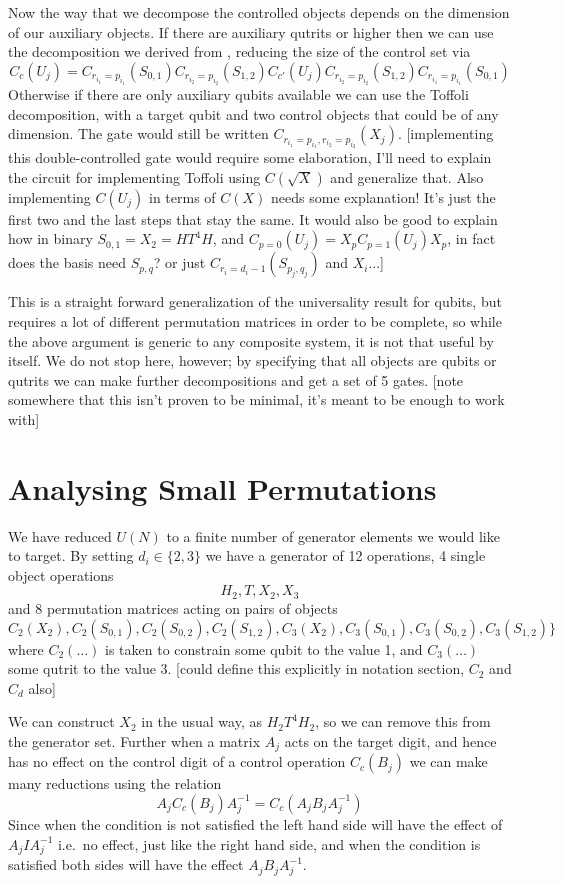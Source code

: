 Now the way that we decompose the controlled objects depends on the dimension of our auxiliary objects. If there are auxiliary qutrits or higher then we can use the decomposition we derived from \cite{multi-valued-logic}, reducing the size of the control set via
\[
C_c(U_j) = C_{r_{i_1}=p_{i_1}}(S_{0,1})
C_{r_{i_2}=p_{i_2}}(S_{1,2})
C_{c'}(U_j)
C_{r_{i_2}=p_{i_2}}(S_{1,2})
C_{r_{i_1}=p_{i_1}}(S_{0,1})
\]
Otherwise if there are only auxiliary qubits available we can use the Toffoli decomposition, with a target qubit and two control objects that could be of any dimension. The gate would still be written $C_{r_{i_1}=p_{i_1},r_{i_2}=p_{i_2}}(X_j)$. [implementing this double-controlled gate would require some elaboration, I'll need to explain the circuit for implementing Toffoli using $C(\sqrt{X})$ and generalize that. Also implementing $C(U_j)$ in terms of $C(X)$ needs some explanation! It's just the first two and the last steps that stay the same. It would also be good to explain how in binary $S_{0,1} = X_2 = HT^4H$, and $C_{p=0}(U_j) = X_pC_{p=1}(U_j)X_p$, in fact does the basis need $S_{p,q}$? or just $C_{r_i=d_i-1}(S_{p_j,q_j})$ and $X_i$...]

This is a straight forward generalization of the universality result for qubits, but requires a lot of different permutation matrices in order to be complete, so while the above argument is generic to any composite system, it is not that useful by itself. We do not stop here, however; by specifying that all objects are qubits or qutrits we can make further decompositions and get a set of 5 gates. [note somewhere that this isn't proven to be minimal, it's meant to be enough to work with]
\section{Analysing Small Permutations}
We have reduced $U(N)$ to a finite number of generator elements we would like to target. By setting $d_i \in \{2, 3\}$ we have a generator of 12 operations, 4 single object operations
\[H_2, T, X_2, X_3\]
and 8 permutation matrices acting on pairs of objects
\[C_2(X_2), C_2(S_{0,1}), C_2(S_{0, 2}), C_2(S_{1, 2}), C_3(X_2), C_3(S_{0, 1}), C_3(S_{0, 2}), C_3(S_{1, 2})\}\]
where $C_2(\dots)$ is taken to constrain some qubit to the value 1, and $C_3(\dots)$ some qutrit to the value 3. [could define this explicitly in notation section, $C_2$ and $C_d$ also]

We can construct $X_2$ in the usual way, as $H_2T^4H_2$, so we can remove this from the generator set. Further when a matrix $A_j$ acts on the target digit, and hence has no effect on the control digit of a control operation $C_c(B_j)$ we can make many reductions using the relation
\[A_jC_c(B_j)A_j^{-1} = C_c(A_jB_jA_j^{-1})\]
Since when the condition is not satisfied the left hand side will have the effect of $A_jIA_j^{-1}$ i.e.\ no effect, just like the right hand side, and when the condition is satisfied both sides will have the effect $A_jB_jA_j^{-1}$.

